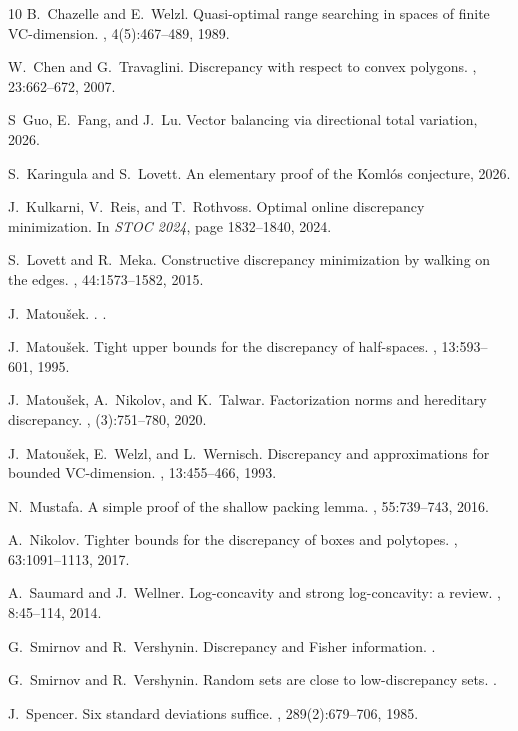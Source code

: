 \documentclass[12pt,reqno]{amsart}
\theoremstyle{remark}
\numberwithin{equation}{section}
\begin{document}
\begin{thebibliography}{10}
B.~Chazelle and E.~Welzl.
\newblock Quasi-optimal range searching in spaces of finite {VC}-dimension.
, 4(5):467--489, 1989.

W.~Chen and G.~Travaglini.
\newblock Discrepancy with respect to convex polygons.
, 23:662--672, 2007.

S~Guo, E.~Fang, and J.~Lu.
\newblock Vector balancing via directional total variation, 2026.

S.~Karingula and S.~Lovett.
\newblock An elementary proof of the {K}oml\'os conjecture, 2026.

J.~Kulkarni, V.~Reis, and T.~Rothvoss.
\newblock Optimal online discrepancy minimization.
\newblock In {\em STOC 2024}, page 1832--1840, 2024.

S.~Lovett and R.~Meka.
\newblock Constructive discrepancy minimization by walking on the edges.
, 44:1573--1582, 2015.

J.~Matou{\v{s}}ek.
.
.

J.~Matou\v{s}ek.
\newblock Tight upper bounds for the discrepancy of half-spaces.
, 13:593--601, 1995.

J.~Matou\v{s}ek, A.~Nikolov, and K.~Talwar.
\newblock Factorization norms and hereditary discrepancy.
, (3):751--780, 2020.

J.~Matou\v{s}ek, E.~Welzl, and L.~Wernisch.
\newblock Discrepancy and approximations for bounded {VC}-dimension.
, 13:455--466, 1993.

N.~Mustafa.
\newblock A simple proof of the shallow packing lemma.
, 55:739--743, 2016.

A.~Nikolov.
\newblock Tighter bounds for the discrepancy of boxes and polytopes.
, 63:1091--1113, 2017.

A.~Saumard and J.~Wellner.
\newblock Log-concavity and strong log-concavity: a review.
, 8:45--114, 2014.

G.~Smirnov and R.~Vershynin.
\newblock Discrepancy and {F}isher information.
.

G.~Smirnov and R.~Vershynin.
\newblock Random sets are close to low-discrepancy sets.
.

J.~Spencer.
\newblock Six standard deviations suffice.
, 289(2):679--706, 1985.

\end{thebibliography}
\end{document}
